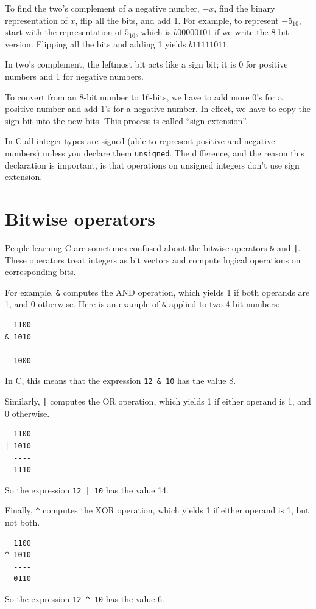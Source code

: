 \documentclass[12pt]{book}
\begin{document}
{To find the two's complement of a negative number, $-x$, find
the binary representation of $x$, flip all the bits, and add 1.
For example, to represent $-5_{10}$, start with the representation
of $5_{10}$, which is $b0000 0101$ if we write the 8-bit version.
Flipping all the bits and adding 1 yields $b1111 1011$.

In two's complement, the leftmost bit acts like a sign bit;
it is 0 for positive numbers and 1 for negative numbers.

To convert from an 8-bit number to 16-bits, we have to add
more 0's for a positive number and add 1's for a negative number.
In effect, we have to copy the sign bit into the new bits.
This process is called ``sign extension''.

In C all integer types are signed (able to represent positive and
negative numbers) unless you declare them {\tt unsigned}.  The
difference, and the reason this declaration is important, is that
operations on unsigned integers don't use sign extension.


\section{Bitwise operators}

People learning C are sometimes confused
about the bitwise operators \verb"&" and \verb"|".  These
operators treat integers as bit vectors and compute logical
operations on corresponding bits.

For example, \verb"&" computes the AND operation, which yields
1 if both operands are 1, and 0 otherwise.  Here is an example
of \verb"&" applied to two 4-bit numbers:
%
\begin{verbatim}
  1100
& 1010
  ----
  1000
\end{verbatim}
%
In C, this means that the expression \verb"12 & 10" has the
value 8.

Similarly, \verb"|" computes the OR operation, which yields
1 if either operand is 1, and 0 otherwise.
%
\begin{verbatim}
  1100
| 1010
  ----
  1110
\end{verbatim}
%
So the expression \verb"12 | 10" has the value 14.

Finally, \verb"^" computes the XOR operation, which yields
1 if either operand is 1, but not both.
%
\begin{verbatim}
  1100
^ 1010
  ----
  0110
\end{verbatim}
%
So the expression \verb"12 ^ 10" has the value 6.

}
\end{document}
